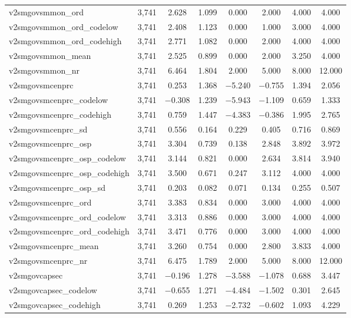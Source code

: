 \begin{table}[!htbp]
\begin{tabular}{@{\extracolsep{5pt}}lccccccc}
v2smgovsmmon\_ord & 3,741 & 2.628 & 1.099 & 0.000 & 2.000 & 4.000 & 4.000 \\ 
v2smgovsmmon\_ord\_codelow & 3,741 & 2.408 & 1.123 & 0.000 & 1.000 & 3.000 & 4.000 \\ 
v2smgovsmmon\_ord\_codehigh & 3,741 & 2.771 & 1.082 & 0.000 & 2.000 & 4.000 & 4.000 \\ 
v2smgovsmmon\_mean & 3,741 & 2.525 & 0.899 & 0.000 & 2.000 & 3.250 & 4.000 \\ 
v2smgovsmmon\_nr & 3,741 & 6.464 & 1.804 & 2.000 & 5.000 & 8.000 & 12.000 \\ 
v2smgovsmcenprc & 3,741 & 0.253 & 1.368 & $-$5.240 & $-$0.755 & 1.394 & 2.056 \\ 
v2smgovsmcenprc\_codelow & 3,741 & $-$0.308 & 1.239 & $-$5.943 & $-$1.109 & 0.659 & 1.333 \\ 
v2smgovsmcenprc\_codehigh & 3,741 & 0.759 & 1.447 & $-$4.383 & $-$0.386 & 1.995 & 2.765 \\ 
v2smgovsmcenprc\_sd & 3,741 & 0.556 & 0.164 & 0.229 & 0.405 & 0.716 & 0.869 \\ 
v2smgovsmcenprc\_osp & 3,741 & 3.304 & 0.739 & 0.138 & 2.848 & 3.892 & 3.972 \\ 
v2smgovsmcenprc\_osp\_codelow & 3,741 & 3.144 & 0.821 & 0.000 & 2.634 & 3.814 & 3.940 \\ 
v2smgovsmcenprc\_osp\_codehigh & 3,741 & 3.500 & 0.671 & 0.247 & 3.112 & 4.000 & 4.000 \\ 
v2smgovsmcenprc\_osp\_sd & 3,741 & 0.203 & 0.082 & 0.071 & 0.134 & 0.255 & 0.507 \\ 
v2smgovsmcenprc\_ord & 3,741 & 3.383 & 0.834 & 0.000 & 3.000 & 4.000 & 4.000 \\ 
v2smgovsmcenprc\_ord\_codelow & 3,741 & 3.313 & 0.886 & 0.000 & 3.000 & 4.000 & 4.000 \\ 
v2smgovsmcenprc\_ord\_codehigh & 3,741 & 3.471 & 0.776 & 0.000 & 3.000 & 4.000 & 4.000 \\ 
v2smgovsmcenprc\_mean & 3,741 & 3.260 & 0.754 & 0.000 & 2.800 & 3.833 & 4.000 \\ 
v2smgovsmcenprc\_nr & 3,741 & 6.475 & 1.789 & 2.000 & 5.000 & 8.000 & 12.000 \\ 
v2smgovcapsec & 3,741 & $-$0.196 & 1.278 & $-$3.588 & $-$1.078 & 0.688 & 3.447 \\ 
v2smgovcapsec\_codelow & 3,741 & $-$0.655 & 1.271 & $-$4.484 & $-$1.502 & 0.301 & 2.645 \\ 
v2smgovcapsec\_codehigh & 3,741 & 0.269 & 1.253 & $-$2.732 & $-$0.602 & 1.093 & 4.229 \\ 

\end{tabular}
\end{table}
